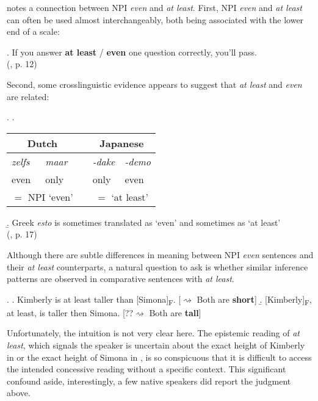 \documentclass[12pt,letterpaper]{scrartcl}
\newcommand{\alignright}{\hspace*{\fill}}
\newcommand{\infer}{$\rightsquigarrow$ }
\newcommand{\sub}[1]{\textsubscript{#1}}
\begin{document}
\cite{rullmann_more_2009} notes a connection between NPI \textit{even} and \textit{at least}. First, NPI \textit{even} and \textit{at least} can often be used almost interchangeably, both being associated with the lower end of a scale:

\ex. If you answer \textbf{at least} / \textbf{even} one question correctly, you'll pass. \\ \alignright (\cite{rullmann_more_2009}, p. 12)

Second, some crosslinguistic evidence appears to suggest that \textit{at least} and \textit{even} are related:

\ex. \a. \begin{tabular}[t]{llp{1cm}ll}
\multicolumn{2}{c}{Dutch} & & \multicolumn{2}{c}{Japanese} \\\hline
\textit{zelfs} & \textit{maar} & & \textit{-dake} & \textit{-demo}\\
even & only & & only & even\\
\multicolumn{2}{c}{$=$ NPI `even'} & & \multicolumn{2}{c}{$=$ `at least'}
\end{tabular}
\b. Greek \textit{esto} is sometimes translated as `even' and sometimes as `at least' \\ \alignright (\cite{rullmann_more_2009}, p. 17)


Although there are subtle differences in meaning between NPI \textit{even} sentences and their \textit{at least} counterparts, a natural question to ask is whether similar inference patterns are observed in comparative sentences with \textit{at least}. 

\ex. \label{at-least} \a. Kimberly is at least taller than [Simona]\sub{F}. \alignright [\infer Both are \textbf{short}] \label{neg-atleast} 
\b. [Kimberly]\sub{F}, at least, is taller then Simona. \alignright [??\infer Both are \textbf{tall}] \label{pos-atleast} 



Unfortunately, the intuition is not very clear here. The epistemic reading of \textit{at least}, which signals the speaker is uncertain about the exact height of Kimberly in \Next[a] or the exact height of Simona in \Next[b], is so conspicuous that it is difficult to access the intended concessive reading without a specific context. This significant confound aside, interestingly, a few native speakers did report the judgment above.
\end{document}
